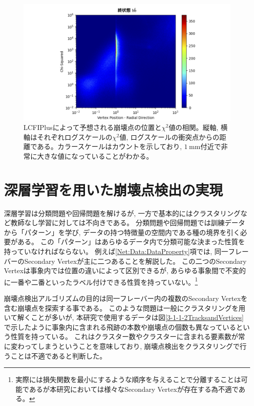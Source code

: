 \begin{figure}[htbp]
 \centering
 \includegraphics[width=1.0\textwidth, clip]{Figure/3Networks/3-1-2-4VertexPositionsvsChiSquare.png}
 \caption[LCFIPlusによって予想される崩壊点の位置と$\chi^2$値の相関]{LCFIPlusによって予想される崩壊点の位置と$\chi^2$値の相関。縦軸, 横軸はそれぞれログスケールの$\chi^2$値, ログスケールの衝突点からの距離である。カラースケールはカウントを示しており, $1\ \mathrm{mm}$付近で非常に大きな値になっていることがわかる。}
 \label{3-1-2-4VertexPositionsvsChiSquare}
\end{figure}

\newpage
\section{深層学習を用いた崩壊点検出の実現} \label{Net:forVertexFinderwithDL}

深層学習は分類問題や回帰問題を解けるが, 一方で基本的にはクラスタリングなど教師なし学習に対しては不向きである。
分類問題や回帰問題では訓練データから「パターン」を学び, データの持つ特徴量の空間内である種の境界を引く必要がある。
この「パターン」はあらゆるデータ内で分類可能な決まった性質を持っていなければならない。
例えば\ref{Net:Data:DataProperty}項では, 同一フレーバーのSecondary Vertexが主に二つあることを解説した。
この二つのSecondary Vertexは事象内では位置の違いによって区別できるが, あらゆる事象間で不変的に一番や二番といったラベル付けできる性質を持っていない。\footnote{実際には損失関数を最小にするような順序を与えることで分離することは可能であるが本研究においては様々なSecondary Vertexが存在する為不適である。}

崩壊点検出アルゴリズムの目的は同一フレーバー内の複数のSecondary Vertexを含む崩壊点を探索する事である。
このような問題は一般にクラスタリングを用いて解くことが多いが, 本研究で使用するデータは図\ref{3-1-1-2TracksandVertices}で示したように事象内に含まれる飛跡の本数や崩壊点の個数も異なっているという性質を持っている。
これはクラスター数やクラスターに含まれる要素数が常に変わってしまうということを意味しており, 崩壊点検出をクラスタリングで行うことは不適であると判断した。

